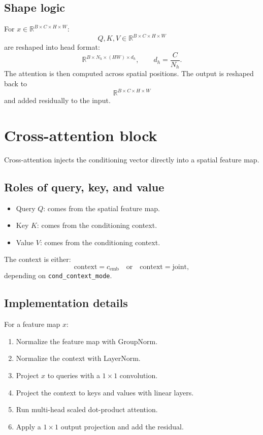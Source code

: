 \documentclass[11pt]{article}
\begin{document}
\subsection{Shape logic}
For $x \in \mathbb{R}^{B \times C \times H \times W}$:
\[
Q,K,V \in \mathbb{R}^{B \times C \times H \times W}
\]
are reshaped into head format:
\[
\mathbb{R}^{B \times N_h \times (HW) \times d_h},
\qquad d_h = \frac{C}{N_h}.
\]
The attention is then computed across spatial positions. The output is reshaped back to
\[
\mathbb{R}^{B \times C \times H \times W}
\]
and added residually to the input.

\section{Cross-attention block}
Cross-attention injects the conditioning vector directly into a spatial feature map.

\subsection{Roles of query, key, and value}
\begin{itemize}
  \item Query $Q$: comes from the spatial feature map.
  \item Key $K$: comes from the conditioning context.
  \item Value $V$: comes from the conditioning context.
\end{itemize}

The context is either:
\[
\text{context} = c_{\mathrm{emb}}
\quad \text{or} \quad
\text{context} = \mathrm{joint},
\]
depending on \texttt{cond\_context\_mode}.

\subsection{Implementation details}
For a feature map $x$:
\begin{enumerate}
  \item Normalize the feature map with GroupNorm.
  \item Normalize the context with LayerNorm.
  \item Project $x$ to queries with a $1 \times 1$ convolution.
  \item Project the context to keys and values with linear layers.
  \item Run multi-head scaled dot-product attention.
  \item Apply a $1 \times 1$ output projection and add the residual.
\end{enumerate}
\end{document}
